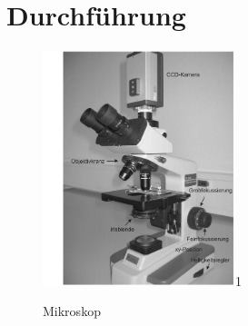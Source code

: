 \documentclass[a4paper,10pt]{article}
\begin{document}
\section[Durchführung]{Durchführung\fnrefb}
 \begin{figure}
  \centering
  \begin{annotate}{\includegraphics[width=0.5\textwidth]{aufbau2.png}}{1}
  \end{annotate}
    \caption{Mikroskop}
 \label{fig:aufbau2}
\end{figure} 
\end{document}
